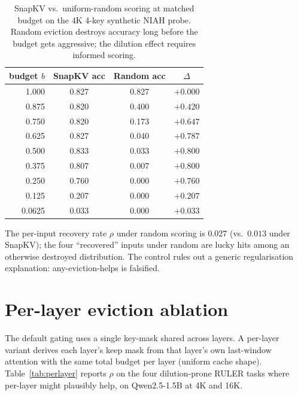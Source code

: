 \documentclass{article}
\begin{document}
\begin{table}[h]
\centering
\caption{SnapKV vs.\ uniform-random scoring at matched budget on the 4K
4-key synthetic NIAH probe. Random eviction destroys accuracy long before
the budget gets aggressive; the dilution effect requires informed scoring.}
\label{tab:random-control}
\begin{tabular}{rccc}
\toprule
budget $b$ & SnapKV acc & Random acc & $\Delta$ \\
\midrule
1.000  & 0.827 & 0.827 & $+0.000$ \\
0.875  & 0.820 & 0.400 & $+0.420$ \\
0.750  & 0.820 & 0.173 & $+0.647$ \\
0.625  & 0.827 & 0.040 & $+0.787$ \\
0.500  & 0.833 & 0.033 & $+0.800$ \\
0.375  & 0.807 & 0.007 & $+0.800$ \\
0.250  & 0.760 & 0.000 & $+0.760$ \\
0.125  & 0.207 & 0.000 & $+0.207$ \\
0.0625 & 0.033 & 0.000 & $+0.033$ \\
\bottomrule
\end{tabular}
\end{table}

The per-input recovery rate $\rho$ under random scoring is $0.027$
(vs.\ $0.013$ under SnapKV); the four ``recovered'' inputs under random
are lucky hits among an otherwise destroyed distribution. The control
rules out a generic regularisation explanation: any-eviction-helps is
falsified.

\section{Per-layer eviction ablation}
\label{app:per-layer}

The default gating uses a single key-mask shared across layers. A per-layer
variant derives each layer's keep mask from that layer's own last-window
attention with the same total budget per layer (uniform cache shape).
Table~\ref{tab:perlayer} reports $\rho$ on the four dilution-prone RULER tasks
where per-layer might plausibly help, on Qwen2.5-1.5B at 4K and 16K.
\end{document}
